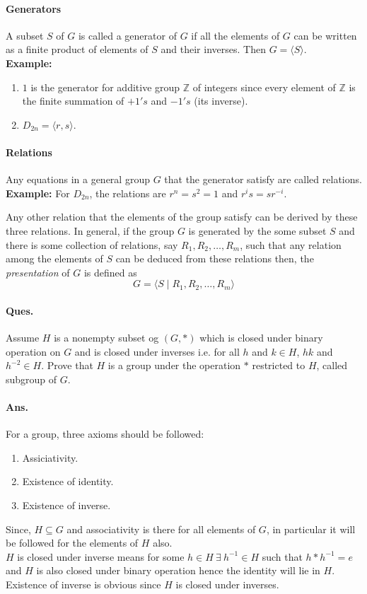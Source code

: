 \documentclass[12pt]{report}
\begin{document}
\paragraph*{Generators}
A subset $S$ of $G$ is called a generator of $G$ if all the elements of $G$ can be written as a finite product of elements of $S$ and their inverses. Then $G = \langle S \rangle$.\\
\textbf{Example: }
\begin{enumerate}
    \item $1$ is the generator for additive group $\mathbb{Z}$ of integers since every element of $\mathbb{Z}$ is the finite summation of $+1's$ and $-1's$ (its inverse).
    \item $D_{2n} = \langle r,s \rangle$. 
\end{enumerate} 
\paragraph*{Relations}
Any equations in a general group $G$ that the generator satisfy are called relations.\\
\textbf{Example: } For $D_{2n}$, the relations are $ r^n = s^2 = 1$ and $r^is = sr^{-i}$.

Any other relation that the elements of the group satisfy can be derived by these three relations. In general, if the group $G$ is generated by the some subset $S$ and there is some collection of relations, say $R_1, R_2, \dots, R_m$, such that any relation among the elements of $S$ can be deduced from these relations then, the {\em presentation} of $G$ is defined as
$$ G = \langle S \mid R_1, R_2, \dots, R_m\rangle$$
\paragraph*{Ques. } Assume $H$ is a nonempty subset og $(G, *)$ which is closed under binary operation on $G$ and is closed under inverses i.e. for all $h$ and $k \in H$, $hk$ and $h^{-2} \in H$. Prove that $H$ is a group under the operation $*$ restricted to $H$, called subgroup of $G$.
\paragraph*{Ans. } For a group, three axioms should be followed: 
\begin{enumerate}
    \item Assiciativity.
    \item Existence of identity.
    \item Existence of inverse.
\end{enumerate} 
Since, $H \subseteq G$ and associativity is there for all elements of $G$, in particular it will be followed for the elements of $H$ also. \\
$H$ is closed under inverse means for some $h \in H ~\exists~ h^{-1} \in H$ such that $h * h^{-1} = e$ and $H$ is also closed under binary operation hence the identity will lie in $H$. Existence of inverse is obvious since $H$ is closed under inverses.
\end{document}
